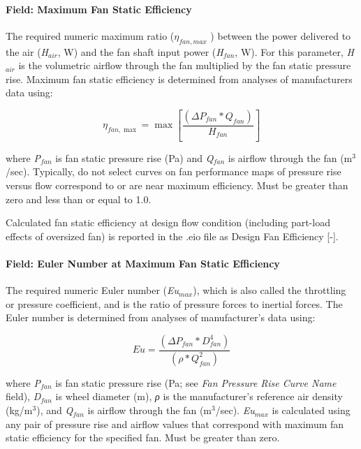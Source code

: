 \paragraph{Field: Maximum Fan Static Efficiency}\label{field-maximum-fan-static-efficiency}

The required numeric maximum ratio (\(\eta_{fan,max}\) ) between the power delivered to the air (\emph{H\(_{air}\)}, W) and the fan shaft input power (\emph{H\(_{fan}\)}, W). For this parameter, \emph{H\(_{air}\)} is the volumetric airflow through the fan multiplied by the fan static pressure rise. Maximum fan static efficiency is determined from analyses of manufacturers data using:

\begin{equation}
{\eta_{fan,\max }} = \max \left[ {\frac{{\left( {\Delta {P_{fan}} * {Q_{fan}}} \right)}}{{{H_{fan}}}}} \right]
\end{equation}

where \emph{P\(_{fan}\)} is fan static pressure rise (Pa) and \emph{Q\(_{fan}\)} is airflow through the fan (m\(^{3}\)/sec). Typically, do not select curves on fan performance maps of pressure rise versus flow correspond to or are near maximum efficiency. Must be greater than zero and less than or equal to 1.0.

Calculated fan static efficiency at design flow condition (including part-load effects of oversized fan) is reported in the .eio file as Design Fan Efficiency {[}-{]}.

\paragraph{Field: Euler Number at Maximum Fan Static Efficiency}\label{field-euler-number-at-maximum-fan-static-efficiency}

The required numeric Euler number (\emph{Eu\(_{max}\)}), which is also called the throttling or pressure coefficient, and is the ratio of pressure forces to inertial forces. The Euler number is determined from analyses of manufacturer's data using:

\begin{equation}
Eu = \frac{{\left( {\Delta {P_{fan}} * D_{fan}^4} \right)}}{{\left( {\rho  * Q_{fan}^2} \right)}}
\end{equation}

where \emph{P\(_{fan}\)} is fan static pressure rise (Pa; see \emph{Fan Pressure Rise Curve Name} field), \emph{D\(_{fan}\)} is wheel diameter (m), \emph{ρ} is the manufacturer's reference air density (kg/m\(^{3}\)), and \emph{Q\(_{fan}\)} is airflow through the fan (m\(^{3}\)/sec). \emph{Eu\(_{max}\)} is calculated using any pair of pressure rise and airflow values that correspond with maximum fan static efficiency for the specified fan. Must be greater than zero.

